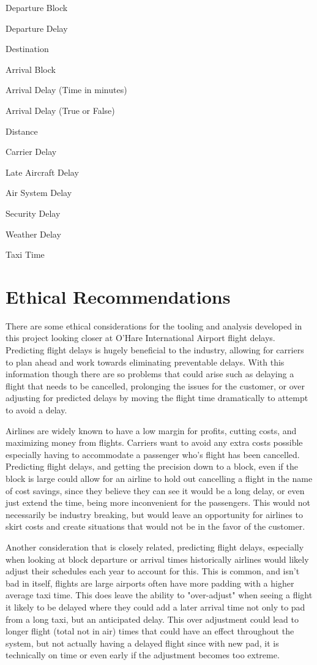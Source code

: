 \documentclass[a4paper,12pt]{article}
\begin{document}
Departure Block

Departure Delay

Destination

Arrival Block

Arrival Delay (Time in minutes)

Arrival Delay (True or False)

Distance 

Carrier Delay

Late Aircraft Delay

Air System Delay

Security Delay

Weather Delay

Taxi Time

\pagebreak

\section{Ethical Recommendations}

There are some ethical considerations for the tooling and analysis developed in this project looking closer at O'Hare International Airport flight delays.
Predicting flight delays is hugely beneficial to the industry, allowing for carriers to plan ahead and work towards eliminating preventable delays.
With this information though there are so problems that could arise such as delaying a flight that needs to be cancelled, prolonging the issues for the customer,
or over adjusting for predicted delays by moving the flight time dramatically to attempt to avoid a delay.

Airlines are widely known to have a low margin for profits, cutting costs, and maximizing money from flights. Carriers want to avoid any extra costs possible especially 
having to accommodate a passenger who's flight has been cancelled. Predicting flight delays, and getting the precision down to a block, even if the block is large could
allow for an airline to hold out cancelling a flight in the name of cost savings, since they believe they can see it would be a long delay, or even just extend the time, being
more inconvenient for the passengers. This would not necessarily be industry breaking, but would leave an opportunity for airlines to skirt costs and create situations
that would not be in the favor of the customer.

Another consideration that is closely related, predicting flight delays, especially when looking at block departure or arrival times historically airlines would likely
adjust their schedules each year to account for this. This is common, and isn't bad in itself, flights are large airports often have more padding with a higher average taxi
time. This does leave the ability to "over-adjust" when seeing a flight it likely to be delayed where they could add a later arrival time not only to pad from a long taxi, but 
an anticipated delay. This over adjustment could lead to longer flight (total not in air) times that could have an effect throughout the system, but not actually having 
a delayed flight since with new pad, it is technically on time or even early if the adjustment becomes too extreme. 
\end{document}
